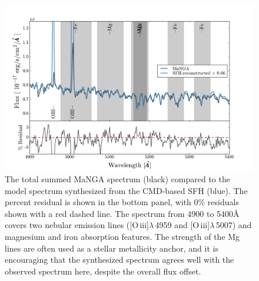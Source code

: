 \documentclass[preprint2]{aastex62}
\newcommand{\oiii}{[O\,{\sc iii}]\xspace}
\newcommand{\ang}{\ensuremath{\mbox{\AA}}\xspace}
\begin{document}
\begin{figure}
  \begin{center}
    \includegraphics[width=\linewidth]{figs/figB.png}
    \caption{The total summed MaNGA spectrum (black) compared to the model spectrum synthesized from the CMD-based SFH (blue). The percent residual is shown in the bottom panel, with 0\% residuals shown with a red dashed line. The spectrum from 4900 to 5400\ang covers two nebular emission lines (\oiii$\lambda$\,4959 and \oiii$\lambda$\,5007) and magnesium and iron absorption features. The strength of the Mg lines are often used as a stellar metallicity anchor, and it is encouraging that the synthesized spectrum agrees well with the observed spectrum here, despite the overall flux offset.}
    \label{fig:zoomSpec1}
  \end{center}
\end{figure}
\end{document}
